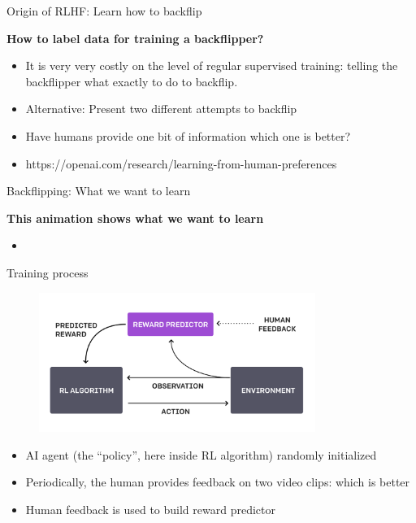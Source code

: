 \begin{vbframe}{Origin of RLHF: Learn how to backflip}

\vfill

\textbf{How to label data for training a backflipper?}

	\begin{itemize}
		\item It is very very costly on the level of
		regular supervised training: telling the
		backflipper what exactly to do to backflip.
                \item Alternative: Present two different
		attempts to backflip
                \item Have humans provide one bit of
		information which one is better?
\item https://openai.com/research/learning-from-human-preferences
	\end{itemize}

\vfill

\end{vbframe}


\begin{vbframe}{Backflipping: What we want to learn}

\vfill

\textbf{This animation shows what we want to learn}

	\begin{itemize}
		\item \href{https://images.openai.com/blob/cf6fdf49-ea9e-489d-a1f1-9753291cd09e/humanfeedbackjump.gif}{}

	\end{itemize}

\vfill

\end{vbframe}

\begin{vbframe}{Training process}

\vfill

\begin{figure}
\centering
\includegraphics[width = 9cm]{figure/trainingprocess.png}
\end{figure}

\begin{itemize}
	\item AI agent (the ``policy'', here inside RL
	algorithm) randomly initialized
	\item Periodically, the human provides feedback on
	two video clips: which is better
        \item Human feedback is used to build reward predictor
\end{itemize}

\vfill

\end{vbframe}


